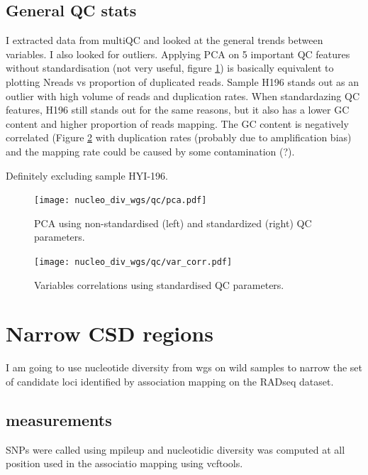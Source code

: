\documentclass[10pt,a4paper]{report}
\begin{document}
\subsection{General QC stats}
I extracted data from multiQC and looked at the general trends between variables. I also looked for outliers.  Applying PCA  on 5 important QC features without standardisation (not very useful, figure \ref{PCA_QC}) is basically equivalent to plotting Nreads vs proportion of duplicated reads. Sample H196 stands out as an outlier with high volume of reads and duplication rates. When standardazing QC features, H196 still stands out for the same reasons, but it also has a lower GC content and higher proportion of reads mapping. The GC content is negatively correlated (Figure \ref{heat_var_QC} with duplication rates (probably due to amplification bias) and the mapping rate could be caused by some contamination (?).

Definitely excluding sample HYI-196.

\begin{figure}
\texttt{[image: nucleo\_div\_wgs/qc/pca.pdf]}
\caption{PCA using non-standardised (left) and standardized (right) QC parameters.}
\label{PCA_QC}
\end{figure}

\begin{figure}
\texttt{[image: nucleo\_div\_wgs/qc/var\_corr.pdf]}
\caption{Variables correlations using standardised QC parameters.}
\label{heat_var_QC}
\end{figure}

\section{Narrow CSD regions}
I am going to use \pi nucleotide diversity from wgs on wild samples to narrow the set of candidate loci identified by association mapping on the RADseq dataset.

\subsection{\pi measurements}
SNPs were called using mpileup and \pi nucleotidic diversity was computed at all position used in the associatio mapping using vcftools.
\end{document}
